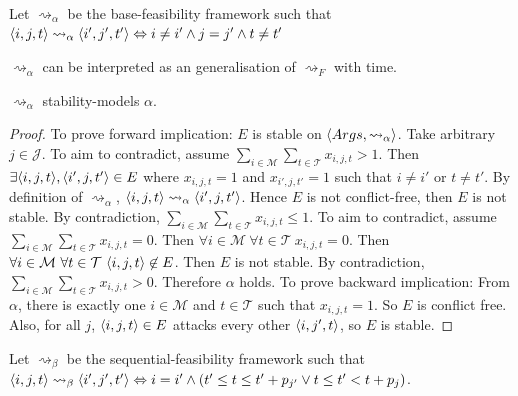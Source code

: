 \begin{definition}
	\label{intervalalpha}
	
	Let $\rightsquigarrow_\alpha$ be the base-feasibility framework such that $\langle{i},{j},{t}\rangle\rightsquigarrow_\alpha\langle{i'},{j'},{t'}\rangle\Leftrightarrow i\neq i'\land j=j'\land t\neq t'$ 
\end{definition}

$\rightsquigarrow_\alpha$ can be interpreted as an generalisation of $\rightsquigarrow_F$ with time.

\begin{lemma}
	\label{stabilityalpha}
	$\rightsquigarrow_\alpha$ stability-models $\alpha$.
	
	\begin{proof}
		To prove forward implication: $E$ is stable on $\langle{Args},{\rightsquigarrow_\alpha}\rangle$. Take arbitrary $j\in\mathcal{J}$. To aim to contradict, assume $\sum_{i\in\mathcal{M}}\sum_{t\in\mathcal{T}}x_{i,j,t}>1$. Then $\exists\langle{i},{j},{t}\rangle,\langle{i'},{j},{t'}\rangle\in E$ where $x_{i,j,t}=1$ and $x_{i',j,t'}=1$ such that $i\neq i'$ or $t\neq t'$. By definition of $\rightsquigarrow_\alpha$, $\langle{i},{j},{t}\rangle\rightsquigarrow_\alpha\langle{i'},{j},{t'}\rangle$. Hence $E$ is not conflict-free, then $E$ is not stable. By contradiction, $\sum_{i\in\mathcal{M}}\sum_{t\in\mathcal{T}}x_{i,j,t}\leq 1$. To aim to contradict, assume $\sum_{i\in\mathcal{M}}\sum_{t\in\mathcal{T}}x_{i,j,t}=0$. Then $\forall i\in\mathcal{M}\ \forall t\in\mathcal{T}\ x_{i,j,t}=0$. Then $\forall i\in\mathcal{M}\ \forall t\in\mathcal{T}\ \langle{i},{j},{t}\rangle\not\in E$. Then $E$ is not stable. By contradiction, $\sum_{i\in\mathcal{M}}\sum_{t\in\mathcal{T}}x_{i,j,t}>0$. Therefore $\alpha$ holds.
		\linespace
		To prove backward implication: From $\alpha$, there is exactly one $i\in\mathcal{M}$ and $t\in\mathcal{T}$ such that $x_{i,j,t}=1$. So $E$ is conflict free. Also, for all $j$, $\langle{i},{j},{t}\rangle\in E$ attacks every other $\langle{i},{j'},{t}\rangle$, so $E$ is stable.
	\end{proof}
\end{lemma}

\begin{definition}
	\label{intervalbeta}
	
	Let $\rightsquigarrow_\beta$ be the sequential-feasibility framework such that $\langle{i},{j},{t}\rangle\rightsquigarrow_\beta\langle{i'},{j'},{t'}\rangle\Leftrightarrow i=i'\land(t'\leq t\leq t'+p_{j'}\lor t\leq t'<t+p_j)$.
\end{definition}

